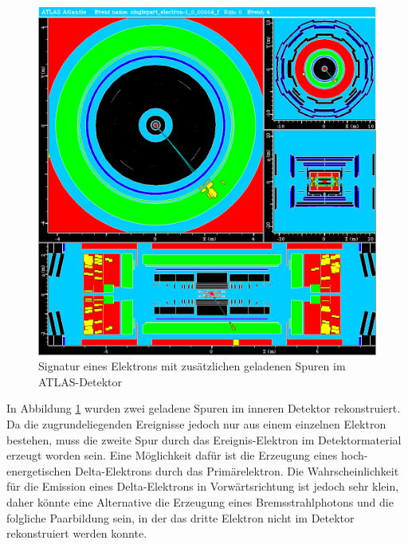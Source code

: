 \documentclass[11pt, a4paper]{article}
\numberwithin{equation}{section}
\begin{document}
\clearpage
\begin{figure}[htbp]
	\centering
	\includegraphics[width=1.0\textwidth]{./data/atlantis/singlepart_events_new/electron/twopart.png}
	\caption{Signatur eines Elektrons mit zusätzlichen geladenen Spuren im ATLAS-Detektor}
	\label{fig:electron-twopart}
\end{figure}
\vfill
\noindent
In Abbildung \ref{fig:electron-twopart} wurden zwei geladene Spuren im inneren Detektor rekonstruiert.
Da die zugrundeliegenden Ereignisse jedoch nur aus einem einzelnen Elektron bestehen, muss die zweite Spur durch das Ereignis-Elektron im Detektormaterial erzeugt worden sein.
Eine Möglichkeit dafür ist die Erzeugung eines hoch-energetischen Delta-Elektrons durch das Primärelektron.
Die Wahrscheinlichkeit für die Emission eines Delta-Elektrons in Vorwärtsrichtung ist jedoch sehr klein, daher könnte eine Alternative die Erzeugung eines Bremsstrahlphotons und die folgliche Paarbildung sein, in der das dritte Elektron nicht im Detektor rekonstruiert werden konnte.
\vfill

\clearpage
\end{document}
